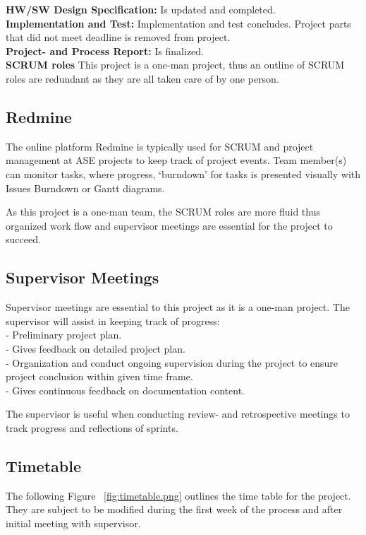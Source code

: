 \textbf{HW/SW Design Specification:} Is updated and completed. \\

\textbf{Implementation and Test:} Implementation and test concludes. Project parts that did not meet deadline is removed from project. \\

\textbf{Project- and Process Report:} Is finalized. \\

\textbf{SCRUM roles}
This project is a one-man project, thus an outline of SCRUM roles are redundant as they are all taken care of by one person. \\

\subsection{Redmine}
The online platform Redmine is typically used for SCRUM and project management at ASE projects to keep track of project events. Team member(s) can monitor tasks, where progress, `burndown' for tasks is presented visually with Issues Burndown or Gantt diagrams. \newline

As this project is a one-man team, the SCRUM roles are more fluid thus organized work flow and supervisor meetings are essential for the project to succeed. \\

\subsection{Supervisor Meetings}
Supervisor meetings are essential to this project as it is a one-man project. The supervisor will assist in keeping track of progress: \\
- Preliminary project plan. \\
- Gives feedback on detailed project plan. \\
- Organization and conduct ongoing supervision during the project to ensure project conclusion within given time frame. \\
- Gives continuous feedback on documentation content. \newline

The supervisor is useful when conducting review- and retrospective meetings to track progress and reflections of sprints. \newline

\subsection{Timetable}
The following Figure ~\ref{fig:timetable.png} outlines the time table for the project. They are subject to be modified during the first week of the process and after initial meeting with supervisor.

